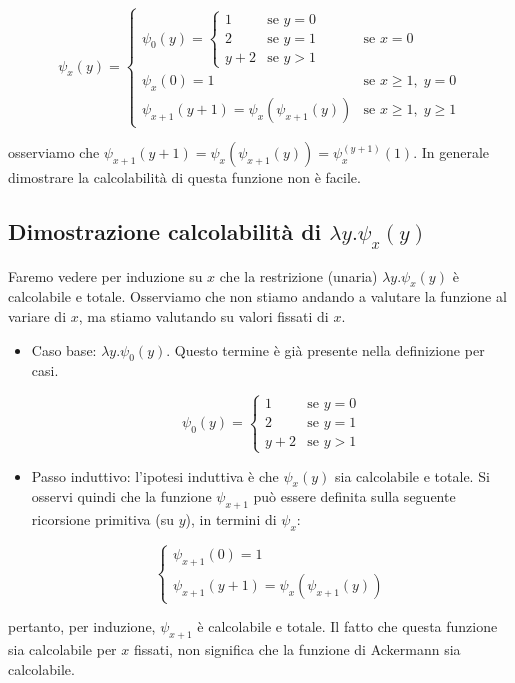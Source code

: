 	$$
	\psi_x(y)=
	\begin{cases}
		\psi_0 (y) = \begin{cases}
			1 & \text{se } y=0 \\
			2 & \text{se } y=1 \\
			y+2 & \text{se } y>1
		\end{cases}
		& \text{se } x=0 \\[14pt]
		\psi_x (0) = 1 & \text{se } x\geq 1,\; y=0 \\[6pt]
		\psi_{x+1}(y+1) = \psi_x(\psi_{x+1}(y)) 
		& \text{se } x\geq 1,\; y\geq 1
	\end{cases}
	$$
	
	osserviamo che $\psi_{x+1}(y+1) = \psi_x(\psi_{x+1}(y)) = \psi_x^{(y+1)}(1)$. In generale dimostrare la calcolabilità di questa funzione non è facile.
	\subsection{Dimostrazione calcolabilità di $\lambda y.\psi_x(y)$}
	Faremo vedere per induzione su $x$ che la restrizione (unaria) $\lambda y.\psi_x(y)$ è calcolabile e totale. Osserviamo che non stiamo andando a valutare la funzione al variare di $x$, ma stiamo valutando su valori fissati di $x$.
	
	\begin{itemize}
		\item Caso base: $\lambda y.\psi_0(y)$. Questo termine è già presente nella definizione per casi.
		
		$$
		\psi_0(y) = \begin{cases}
			1 & \text{se } y=0 \\
			2 & \text{se } y=1 \\
			y+2 & \text{se } y>1
		\end{cases}
		$$
		\item Passo induttivo: l'ipotesi induttiva è che $\psi_x(y)$ sia calcolabile e totale. Si osservi quindi che la funzione $\psi_{x+1}$ può essere definita sulla seguente ricorsione primitiva (su $y$), in termini di $\psi_x$:
		
		$$
		\begin{cases}
		\psi_{x+1}(0) = 1\\
		\psi_{x+1} (y+1) = \psi_x(\psi_{x+1}(y))
		\end{cases}
		$$
	\end{itemize}
	
	pertanto, per induzione, $\psi_{x+1}$ è calcolabile e totale. Il fatto che questa funzione sia calcolabile per $x$ fissati, non significa che la funzione di Ackermann sia calcolabile.
	
